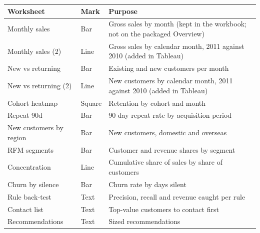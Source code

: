 \begin{tabular}{llp{6.3cm}}
\toprule
Worksheet & Mark & Purpose \\
\midrule
Monthly sales & Bar & Gross sales by month (kept in the workbook; not on the packaged Overview) \\
Monthly sales (2) & Line & Gross sales by calendar month, 2011 against 2010 (added in Tableau) \\
New vs returning & Bar & Existing and new customers per month \\
New vs returning (2) & Line & New customers by calendar month, 2011 against 2010 (added in Tableau) \\
Cohort heatmap & Square & Retention by cohort and month \\
Repeat 90d & Bar & 90-day repeat rate by acquisition period \\
New customers by region & Bar & New customers, domestic and overseas \\
RFM segments & Bar & Customer and revenue shares by segment \\
Concentration & Line & Cumulative share of sales by share of customers \\
Churn by silence & Bar & Churn rate by days silent \\
Rule back-test & Text & Precision, recall and revenue caught per rule \\
Contact list & Text & Top-value customers to contact first \\
Recommendations & Text & Sized recommendations \\
\bottomrule
\end{tabular}
